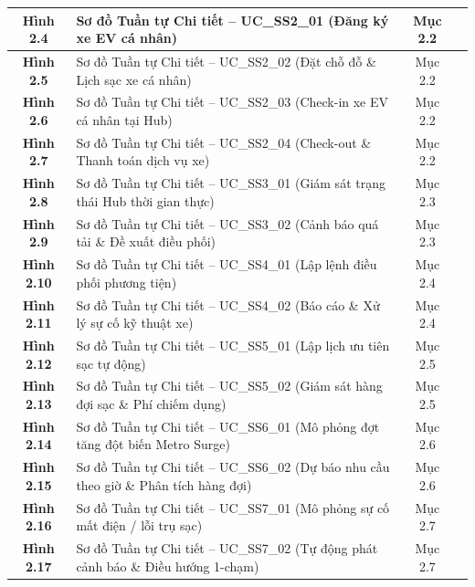 \documentclass[12pt,a4paper]{article}
\begin{document}
\begin{longtable}{|c|p{8.5cm}|c|c|}
    \hline
    \textbf{Hình 2.4} & Sơ đồ Tuần tự Chi tiết -- UC\_SS2\_01 (Đăng ký xe EV cá nhân) & Mục 2.2 & \pageref{fig:seq-ss2-01} \\
    \hline
    \textbf{Hình 2.5} & Sơ đồ Tuần tự Chi tiết -- UC\_SS2\_02 (Đặt chỗ đỗ \& Lịch sạc xe cá nhân) & Mục 2.2 & \pageref{fig:seq-ss2-02} \\
    \hline
    \textbf{Hình 2.6} & Sơ đồ Tuần tự Chi tiết -- UC\_SS2\_03 (Check-in xe EV cá nhân tại Hub) & Mục 2.2 & \pageref{fig:seq-ss2-03} \\
    \hline
    \textbf{Hình 2.7} & Sơ đồ Tuần tự Chi tiết -- UC\_SS2\_04 (Check-out \& Thanh toán dịch vụ xe) & Mục 2.2 & \pageref{fig:seq-ss2-04} \\
    \hline
    \textbf{Hình 2.8} & Sơ đồ Tuần tự Chi tiết -- UC\_SS3\_01 (Giám sát trạng thái Hub thời gian thực) & Mục 2.3 & \pageref{fig:seq-ss3-01} \\
    \hline
    \textbf{Hình 2.9} & Sơ đồ Tuần tự Chi tiết -- UC\_SS3\_02 (Cảnh báo quá tải \& Đề xuất điều phối) & Mục 2.3 & \pageref{fig:seq-ss3-02} \\
    \hline
    \textbf{Hình 2.10} & Sơ đồ Tuần tự Chi tiết -- UC\_SS4\_01 (Lập lệnh điều phối phương tiện) & Mục 2.4 & \pageref{fig:seq-ss4-01} \\
    \hline
    \textbf{Hình 2.11} & Sơ đồ Tuần tự Chi tiết -- UC\_SS4\_02 (Báo cáo \& Xử lý sự cố kỹ thuật xe) & Mục 2.4 & \pageref{fig:seq-ss4-02} \\
    \hline
    \textbf{Hình 2.12} & Sơ đồ Tuần tự Chi tiết -- UC\_SS5\_01 (Lập lịch ưu tiên sạc tự động) & Mục 2.5 & \pageref{fig:seq-ss5-01} \\
    \hline
    \textbf{Hình 2.13} & Sơ đồ Tuần tự Chi tiết -- UC\_SS5\_02 (Giám sát hàng đợi sạc \& Phí chiếm dụng) & Mục 2.5 & \pageref{fig:seq-ss5-02} \\
    \hline
    \textbf{Hình 2.14} & Sơ đồ Tuần tự Chi tiết -- UC\_SS6\_01 (Mô phỏng đợt tăng đột biến Metro Surge) & Mục 2.6 & \pageref{fig:seq-ss6-01} \\
    \hline
    \textbf{Hình 2.15} & Sơ đồ Tuần tự Chi tiết -- UC\_SS6\_02 (Dự báo nhu cầu theo giờ \& Phân tích hàng đợi) & Mục 2.6 & \pageref{fig:seq-ss6-02} \\
    \hline
    \textbf{Hình 2.16} & Sơ đồ Tuần tự Chi tiết -- UC\_SS7\_01 (Mô phỏng sự cố mất điện / lỗi trụ sạc) & Mục 2.7 & \pageref{fig:seq-ss7-01} \\
    \hline
    \textbf{Hình 2.17} & Sơ đồ Tuần tự Chi tiết -- UC\_SS7\_02 (Tự động phát cảnh báo \& Điều hướng 1-chạm) & Mục 2.7 & \pageref{fig:seq-ss7-02} \\

\end{longtable}
\end{document}
